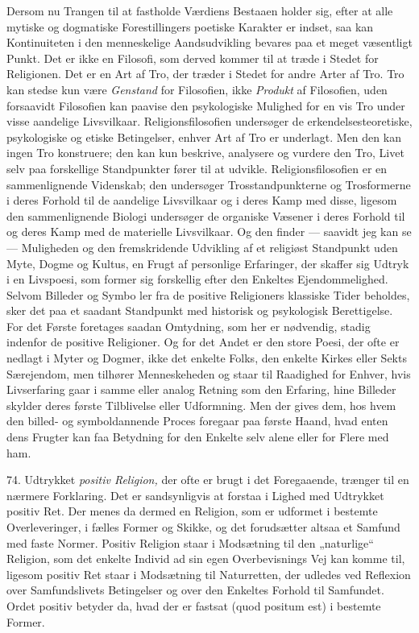 \documentclass[12pt,a4paper,openany]{book}
\newcommand{\opage}[1]{\marginnote{\footnotesize\textit{[#1]}}}
\begin{document}
Dersom nu Trangen til at fastholde Værdiens Bestaaen holder sig, efter
at alle mytiske og dogmatiske Forestillingers poetiske Karakter er
indset, saa kan Kontinuiteten i den menneskelige Aandsudvikling bevares
paa et meget væsentligt Punkt. Det er ikke en Filosofi, som derved
kommer til at træde i Stedet for Religionen. Det er en Art af Tro, der
træder i Stedet for andre Arter af Tro. Tro kan stedse kun være
\textit{Genstand} for Filosofien, ikke \textit{Produkt} af Filosofien,
uden forsaavidt Filosofien kan paavise den psykologiske Mulighed for en
vis Tro under visse aandelige Livsvilkaar. Religionsfilosofien
undersøger de erkendelsesteoretiske, psykologiske og etiske Betingelser,
enhver Art af Tro er underlagt. Men den kan ingen Tro konstruere; den
kan kun beskrive, analysere og vurdere den Tro, Livet selv paa
forskellige Standpunkter fører til at udvikle. Religionsfilosofien er en
sammenlignende Videnskab; den undersøger Trosstandpunkterne og
Trosformerne i deres Forhold til de aandelige Livsvilkaar og i deres
Kamp med disse, ligesom den sammenlignende Biologi undersøger de
organiske Væsener i deres Forhold til og deres Kamp med de materielle
Livsvilkaar. Og den finder --- saavidt jeg kan se--- Muligheden og den
fremskridende Udvikling af et religiøst Standpunkt uden Myte, Dogme og
Kultus, en Frugt af personlige Erfaringer, der skaffer sig Udtryk i en
Livspoesi, som former sig forskellig efter den Enkeltes Ejendommelighed.
Selvom Billeder og Symbo%
\opage{171}ler fra de positive Religioners klassiske Tider beholdes,
sker det paa et saadant Standpunkt med historisk og psykologisk
Berettigelse. For det Første foretages saadan Omtydning, som her er
nødvendig, stadig indenfor de positive Religioner. Og for det Andet er
den store Poesi, der ofte er nedlagt i Myter og Dogmer, ikke det enkelte
Folks, den enkelte Kirkes eller Sekts Særejendom, men tilhører
Menneskeheden og staar til Raadighed for Enhver, hvis Livserfaring gaar
i samme eller analog Retning som den Erfaring, hine Billeder skylder
deres første Tilblivelse eller Udformning. Men der gives dem, hos hvem
den billed- og symboldannende Proces foregaar paa første Haand, hvad
enten dens Frugter kan faa Betydning for den Enkelte selv alene eller
for Flere med ham.

74. Udtrykket \textit{positiv Religion,} der ofte er brugt i det
Foregaaende, trænger til en nærmere Forklaring. Det er sandsynligvis at
forstaa i Lighed med Udtrykket positiv Ret. Der menes da dermed en
Religion, som er udformet i bestemte Overleveringer, i fælles Former og
Skikke, og det forudsætter altsaa et Samfund med faste Normer. Positiv
Religion staar i Modsætning til den „naturlige“ Religion, som det
enkelte Individ ad sin egen Overbevisnings Vej kan komme til, ligesom
positiv Ret staar i Modsætning til Naturretten, der udledes ved
Reflexion over Samfundslivets Betingelser og over den Enkeltes Forhold
til Samfundet. Ordet positiv betyder da, hvad der er fastsat (quod
positum est) i bestemte Former.
\end{document}
